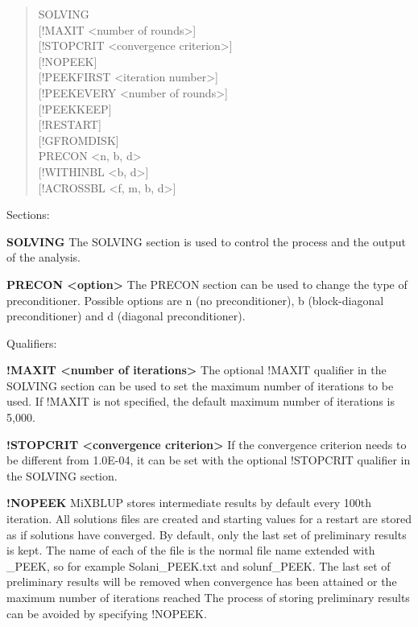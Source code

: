 \begin{quote}
SOLVING\\
{[}!MAXIT \textless number of rounds\textgreater{]}\\
{[}!STOPCRIT \textless convergence criterion\textgreater{]}\\
{[}!NOPEEK{]}\\
{[}!PEEKFIRST \textless iteration number\textgreater{]}\\
{[}!PEEKEVERY \textless number of rounds\textgreater{]}\\
{[}!PEEKKEEP{]}\\
{[}!RESTART{]}\\
{[}!GFROMDISK{]}\\
PRECON \textless n, b, d\textgreater{}\\
{[}!WITHINBL \textless b, d\textgreater{]}\\
{[}!ACROSSBL \textless f, m, b, d\textgreater{]}
\end{quote}

Sections:

\textbf{SOLVING} The SOLVING section is used to control the process and
the output of the analysis.

\textbf{PRECON \textless option\textgreater{}} The PRECON section can be
used to change the type of preconditioner. Possible options are n (no
preconditioner), b (block-diagonal preconditioner) and d (diagonal
preconditioner).

Qualifiers:

\textbf{!MAXIT \textless number of iterations\textgreater{}} The
optional !MAXIT qualifier in the SOLVING section can be used to set the
maximum number of iterations to be used. If !MAXIT is not specified, the
default maximum number of iterations is 5,000.

\textbf{!STOPCRIT \textless convergence criterion\textgreater{}} If the
convergence criterion needs to be different from 1.0E-04, it can be set
with the optional !STOPCRIT qualifier in the SOLVING section.

\textbf{!NOPEEK} MiXBLUP stores intermediate results by default every
100th iteration. All solutions files are created and starting values for
a restart are stored as if solutions have converged. By default, only
the last set of preliminary results is kept. The name of each of the
file is the normal file name extended with \_PEEK, so for example
Solani\_PEEK.txt and solunf\_PEEK. The last set of preliminary results
will be removed when convergence has been attained or the maximum number
of iterations reached The process of storing preliminary results can be
avoided by specifying !NOPEEK.

